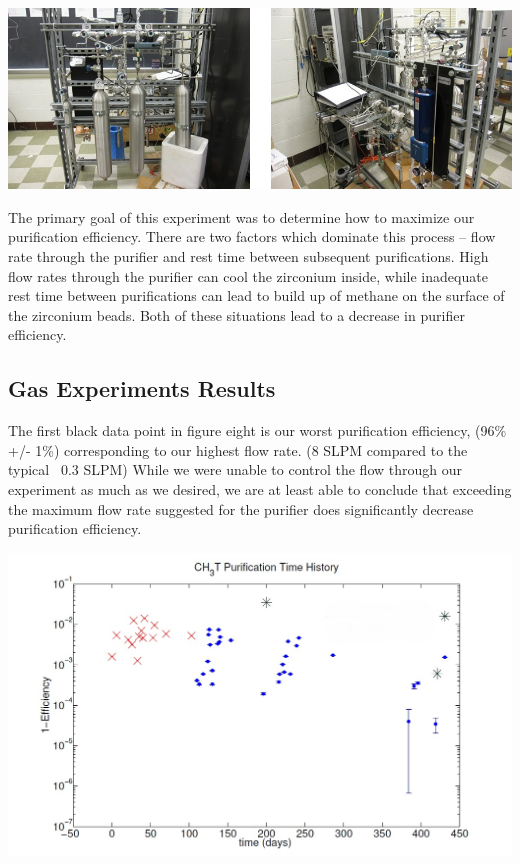 \documentclass[a4paper,12pt]{article}
\begin{document}
\begin{center}
\includegraphics[scale=0.5]{gassys.jpg}
\end{center}

The primary goal of this experiment was to determine how to maximize our purification efficiency.  There are two factors which dominate this process -- flow rate through the purifier and rest time between subsequent purifications.  High flow rates through the purifier can cool the zirconium inside, while inadequate rest time between purifications can lead to build up of methane on the surface of the zirconium beads.  Both of these situations lead to a decrease in purifier efficiency. 

\subsection{Gas Experiments Results}

The first black data point in figure eight is our worst purification efficiency, (96\% +/- 1\%) corresponding to our highest flow rate. (8 SLPM compared to the typical ~0.3 SLPM)  While we were unable to control the flow through our experiment as much as we desired, we are at least able to conclude that exceeding the maximum flow rate suggested for the purifier does significantly decrease purification efficiency.

\begin{center}
\includegraphics[scale=0.5]{Figone.jpg}
\end{center}
\end{document}
